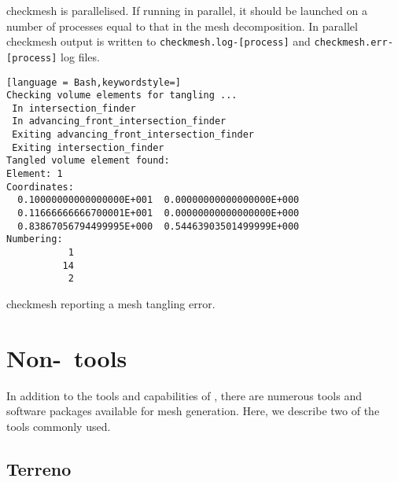 
checkmesh is parallelised. If running in parallel, it should be launched on
a number of processes equal to that in the mesh decomposition. In parallel
checkmesh output is written to \onlypdf\linebreak \lstinline+checkmesh.log-[process]+
and \lstinline+checkmesh.err-[process]+ log files.

\begin{example}
\begin{lstlisting}[language = Bash,keywordstyle=]
Checking volume elements for tangling ...
 In intersection_finder
 In advancing_front_intersection_finder
 Exiting advancing_front_intersection_finder
 Exiting intersection_finder
Tangled volume element found: 
Element: 1
Coordinates:
  0.10000000000000000E+001  0.00000000000000000E+000
  0.11666666666700001E+001  0.00000000000000000E+000
  0.83867056794499995E+000  0.54463903501499999E+000
Numbering:
           1
          14
           2
\end{lstlisting}
\caption{checkmesh reporting a mesh tangling error.}
\end{example}

\section{Non-\fluidity\ tools}

In addition to the tools and capabilities of \fluidity, there are numerous
tools and software packages available for mesh generation. Here, we describe 
two of the tools commonly used.

\subsection{Terreno}

